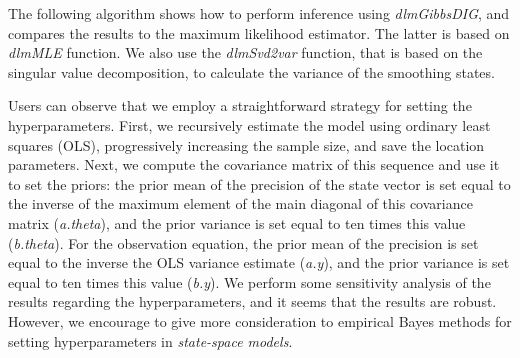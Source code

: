 The following algorithm shows how to perform inference using \textit{dlmGibbsDIG}, and compares the results to the maximum likelihood estimator. The latter is based on \textit{dlmMLE} function. We also use the \textit{dlmSvd2var} function, that is based on the singular value decomposition, to calculate the variance of the smoothing states.

Users can observe that we employ a straightforward strategy for setting the hyperparameters. First, we recursively estimate the model using ordinary least squares (OLS), progressively increasing the sample size, and save the location parameters. Next, we compute the covariance matrix of this sequence and use it to set the priors: the prior mean of the precision of the state vector is set equal to the inverse of the maximum element of the main diagonal of this covariance matrix (\textit{a.theta}), and the prior variance is set equal to ten times this value (\textit{b.theta}). For the observation equation, the prior mean of the precision is set equal to the inverse the OLS variance estimate (\textit{a.y}), and the prior variance is set equal to ten times this value (\textit{b.y}). We perform some sensitivity analysis of the results regarding the hyperparameters, and it seems that the results are robust. However, we encourage to give more consideration to empirical Bayes methods for setting hyperparameters in \textit{state-space models}.

